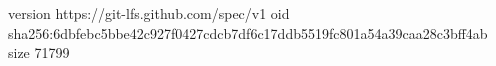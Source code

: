 version https://git-lfs.github.com/spec/v1
oid sha256:6dbfebc5bbe42c927f0427cdcb7df6c17ddb5519fc801a54a39caa28c3bff4ab
size 71799
